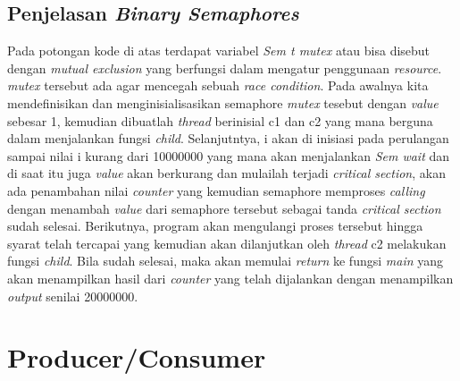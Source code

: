 \documentclass[11pt,a4paper]{article}
\begin{document}
\subsection{Penjelasan \textit{Binary Semaphores}}
Pada potongan kode di atas terdapat variabel \textit{Sem t mutex} atau bisa disebut dengan \textit{mutual exclusion} yang berfungsi dalam mengatur penggunaan \textit{resource}. \textit{mutex} tersebut ada agar mencegah sebuah
\textit{race condition}. Pada awalnya kita mendefinisikan dan menginisialisasikan semaphore \textit{mutex} tesebut dengan \textit{value} sebesar 1, kemudian dibuatlah \textit{thread} berinisial c1 dan c2 yang mana berguna dalam 
menjalankan fungsi \textit{child}. Selanjutntya, i akan di inisiasi pada perulangan sampai nilai i kurang dari 10000000 yang mana akan menjalankan \textit{Sem wait} dan di saat itu juga \textit{value} akan berkurang dan mulailah terjadi 
\textit{critical section}, akan ada penambahan nilai \textit{counter} yang kemudian semaphore memproses \textit{calling} dengan menambah \textit{value} dari semaphore tersebut sebagai tanda \textit{critical section} sudah selesai.
Berikutnya, program akan mengulangi proses tersebut hingga syarat telah tercapai yang kemudian akan dilanjutkan oleh \textit{thread} c2 melakukan fungsi \textit{child}. Bila sudah selesai, maka akan memulai \textit{return} ke fungsi \textit{main} 
yang akan menampilkan hasil dari \textit{counter} yang telah dijalankan dengan menampilkan \textit{output} senilai 20000000.

\section{Producer/Consumer}
\end{document}
